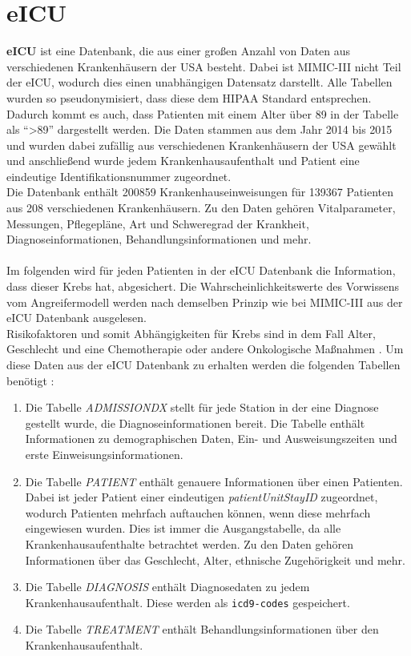 \documentclass[german,version-2020-11]{uzl-thesis}
\begin{document}
\section{eICU}
\textbf{eICU} ist eine Datenbank, die aus einer großen Anzahl von Daten aus verschiedenen Krankenhäusern der USA besteht. Dabei ist MIMIC-III nicht Teil der eICU, wodurch dies einen unabhängigen Datensatz darstellt. Alle Tabellen wurden so pseudonymisiert, dass diese dem HIPAA Standard entsprechen. Dadurch kommt es auch, dass Patienten mit einem Alter über 89 in der Tabelle als \enquote{>89} dargestellt werden. Die Daten stammen aus dem Jahr 2014 bis 2015 und wurden dabei zufällig aus verschiedenen Krankenhäusern der USA gewählt und anschließend wurde jedem Krankenhausaufenthalt und Patient eine eindeutige Identifikationsnummer zugeordnet. \\ 
Die Datenbank enthält 200859 Krankenhauseinweisungen für 139367 Patienten aus 208 verschiedenen Krankenhäusern. Zu den Daten gehören Vitalparameter, Messungen, Pflegepläne, Art und Schweregrad der Krankheit, Diagnoseinformationen, Behandlungsinformationen und mehr. \\ \\
Im folgenden wird für jeden Patienten in der eICU Datenbank die Information, dass dieser Krebs hat, abgesichert. Die Wahrscheinlichkeitswerte des Vorwissens vom Angreifermodell werden nach demselben Prinzip wie bei MIMIC-III aus der eICU Datenbank ausgelesen. \\ 
Risikofaktoren und somit Abhängigkeiten für Krebs sind in dem Fall Alter, Geschlecht und eine Chemotherapie oder andere Onkologische Maßnahmen \cite{13,14}. Um diese Daten aus der eICU Datenbank zu erhalten werden die folgenden Tabellen benötigt : 
\begin{enumerate}
	\item Die Tabelle \textit{ADMISSIONDX} stellt für jede Station in der eine Diagnose gestellt wurde, die Diagnoseinformationen bereit. Die Tabelle enthält Informationen zu demographischen Daten, Ein- und Ausweisungszeiten und erste Einweisungsinformationen.
	\item Die Tabelle \textit{PATIENT} enthält genauere Informationen über einen Patienten.  Dabei ist jeder Patient einer eindeutigen \textit{patientUnitStayID} zugeordnet, wodurch Patienten mehrfach auftauchen können, wenn diese mehrfach eingewiesen wurden. Dies ist immer die Ausgangstabelle, da alle Krankenhausaufenthalte betrachtet werden. Zu den Daten gehören Informationen über das Geschlecht, Alter, ethnische Zugehörigkeit und mehr.
	\item Die Tabelle \textit{DIAGNOSIS} enthält Diagnosedaten zu jedem Krankenhausaufenthalt. Diese werden als \texttt{icd9-codes} gespeichert.
	\item Die Tabelle \textit{TREATMENT } enthält Behandlungsinformationen über den Krankenhausaufenthalt.
\end{enumerate} 
\end{document}
